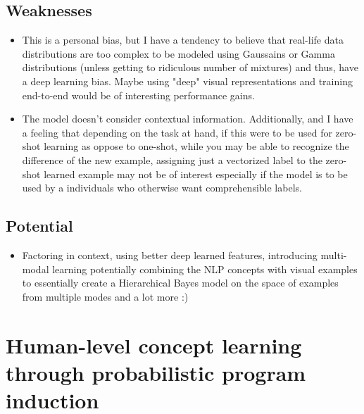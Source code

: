 \documentclass{article}
\begin{document}
\subsection{Weaknesses}
\begin{itemize}
    \item This is a personal bias, but I have a tendency to believe that real-life data distributions are too complex to be modeled using Gaussains or Gamma distributions (unless getting to ridiculous number of mixtures) and thus, have a deep learning bias. Maybe using "deep" visual representations and training end-to-end would be of interesting performance gains.
    \item The model doesn't consider contextual information. Additionally, and I have a feeling that depending on the task at hand, if this were to be used for zero-shot learning as oppose to one-shot, while you may be able to recognize the difference of the new example, assigning just a vectorized label to the zero-shot learned example may not be of interest especially if the model is to be used by a individuals who otherwise want comprehensible labels.
\end{itemize}

\subsection{Potential}
\begin{itemize}
    \item Factoring in context, using better deep learned features, introducing multi-modal learning potentially combining the NLP concepts with visual examples to essentially create a Hierarchical Bayes model on the space of examples from multiple modes and a lot more :)
\end{itemize}

\section{Human-level concept learning through probabilistic program induction \cite{lake2015}}
\end{document}
